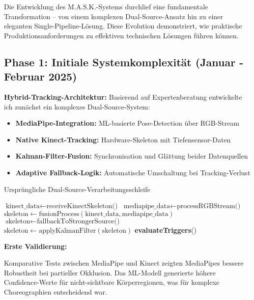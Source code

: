 Die Entwicklung des M.A.S.K.-Systems durchlief eine fundamentale Transformation – von einem komplexen Dual-Source-Ansatz hin zu einer eleganten Single-Pipeline-Lösung. Diese Evolution demonstriert, wie praktische Produktionsanforderungen zu effektiven technischen Lösungen führen können.

\subsection{Phase 1: Initiale Systemkomplexität (Januar - Februar 2025)}

\textbf{Hybrid-Tracking-Architektur:}
Basierend auf Expertenberatung entwickelte ich zunächst ein komplexes Dual-Source-System:
\begin{itemize}
    \item \textbf{MediaPipe-Integration:} ML-basierte Pose-Detection über RGB-Stream
    \item \textbf{Native Kinect-Tracking:} Hardware-Skeleton mit Tiefensensor-Daten
    \item \textbf{Kalman-Filter-Fusion:} Synchronisation und Glättung beider Datenquellen
    \item \textbf{Adaptive Fallback-Logik:} Automatische Umschaltung bei Tracking-Verlust
\end{itemize}

\begin{algorithm}[H]
\caption{Ursprüngliche Dual-Source-Verarbeitungsschleife}
\begin{algorithmic}[1]
    \State $\text{kinect\_data} \leftarrow \text{receiveKinectSkeleton()}$
    \State $\text{mediapipe\_data} \leftarrow \text{processRGBStream()}$
        \State $\text{skeleton} \leftarrow \text{fusionProcess}(\text{kinect\_data}, \text{mediapipe\_data})$
    \Else
        \State $\text{skeleton} \leftarrow \text{fallbackToStrongerSource()}$
    \EndIf
    \State $\text{skeleton} \leftarrow \text{applyKalmanFilter}(\text{skeleton})$
    \State \textbf{evaluateTriggers}()
\end{algorithmic}
\end{algorithm}

\textbf{Erste Validierung:}
\raggedright Komparative Tests zwischen MediaPipe und Kinect zeigten MediaPipes bessere Robustheit bei partieller Okklusion. Das ML-Modell generierte höhere Confidence-Werte für nicht-sichtbare Körperregionen, was für komplexe Choreographien entscheidend war.

